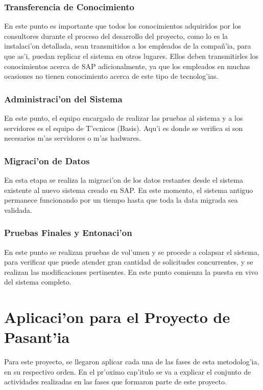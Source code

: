 \subsubsection*{Transferencia de Conocimiento}
	En este punto es importante que todos los conocimientos adquiridos por los consultores durante el proceso del desarrollo del proyecto, como lo es la instalaci'on detallada, sean transmitidos a los empleados de la compa\~n'ia, para que as'i, puedan replicar el sistema en otros lugares. Ellos deben transmitirles los conocimientos acerca de SAP adicionalmente, ya que los empleados en muchas ocasiones no tienen conocimiento acerca de este tipo de tecnolog'ias. 
	
\subsubsection*{Administraci'on del Sistema}
	En este punto, el equipo encargado de realizar las pruebas al sistema y a los servidores es el equipo de T'ecnicos (Basis). Aqu'i es donde se verifica si son necesarios m'as servidores o m'as hadwares.
	
\subsubsection*{Migraci'on de Datos}
	En esta etapa se realiza la migraci'on de los datos restantes desde el sistema existente al nuevo sistema creado en SAP. En este momento, el sistema antiguo permanece funcionando por un tiempo hasta que toda la data migrada sea validada. 
	
\subsubsection*{Pruebas Finales y Entonaci'on}
	En este punto se realizan pruebas de vol'umen y se procede  a colapsar el sistema, para verificar que puede atender gran cantidad de solicitudes concurrentes, y se realizan las modificaciones pertinentes. En este punto comienza la puesta en vivo del sistema completo.

\section{Aplicaci'on para el Proyecto de Pasant'ia}
	Para este proyecto, se llegaron aplicar cada una de las fases de esta metodolog'ia, en su respectivo orden.
\newline
\newline
\indent En el pr'oximo cap'itulo se va a explicar el conjunto de actividades realizadas en las fases que formaron parte de este proyecto.